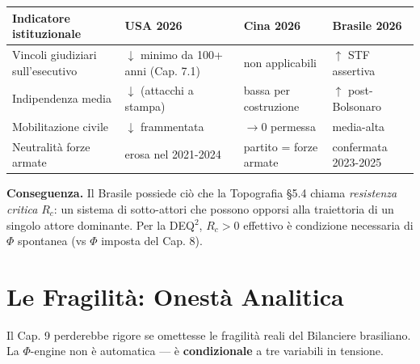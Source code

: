 {\def\LTcaptype{none} %
{\small\begin{longtable}[]{@{}
  >{\raggedright\arraybackslash}p{}
  >{\raggedright\arraybackslash}p{}
  >{\raggedright\arraybackslash}p{}
  >{\raggedright\arraybackslash}p{}@{}}
\toprule\noalign{}
\begin{minipage}[b]{\linewidth}\raggedright
Indicatore istituzionale
\end{minipage} & \begin{minipage}[b]{\linewidth}\raggedright
USA 2026
\end{minipage} & \begin{minipage}[b]{\linewidth}\raggedright
Cina 2026
\end{minipage} & \begin{minipage}[b]{\linewidth}\raggedright
Brasile 2026
\end{minipage} \\
\midrule\noalign{}
\endhead
\bottomrule\noalign{}
\endlastfoot
Vincoli giudiziari sull'esecutivo & \(\downarrow\) minimo da 100+ anni
(Cap. 7.1) & non applicabili & \(\uparrow\) STF assertiva \\
Indipendenza media & \(\downarrow\) (attacchi a stampa) & bassa per
costruzione & \(\uparrow\) post-Bolsonaro \\
Mobilitazione civile & \(\downarrow\) frammentata & \(\to 0\) permessa &
media-alta \\
Neutralità forze armate & erosa nel 2021-2024 & partito = forze armate &
confermata 2023-2025 \\
\end{longtable}}
}

\Proved{} \textbf{Conseguenza.} Il Brasile possiede ciò che la
Topografia \S{}5.4 chiama \emph{resistenza critica} \(R_c\): un sistema di
sotto-attori che possono opporsi alla traiettoria di un singolo attore
dominante. Per la DEQ$^2$, \(R_c > 0\) effettivo è condizione necessaria di
\(\Phi\) spontanea (vs \(\Phi\) imposta del Cap. 8).



\section{Le Fragilità: Onestà
Analitica}\label{le-fragilituxe0-onestuxe0-analitica}

Il Cap. 9 perderebbe rigore se omettesse le fragilità reali del
Bilanciere brasiliano. La \(\Phi\)-engine non è automatica --- è
\textbf{condizionale} a tre variabili in tensione.

